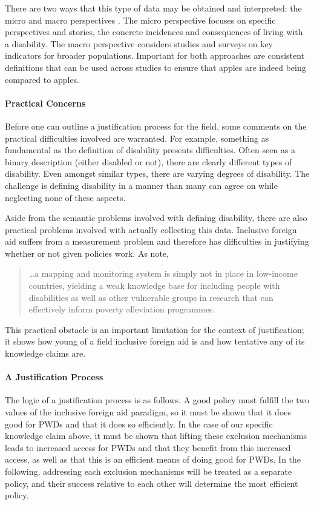 \documentclass[a4paper]{article}
\begin{document}
There are two ways that this type of data may be obtained and interpreted: the
micro and macro perspectives \citep{ingstad2011disability}. The micro
perspective focuses on specific perspectives and stories, the concrete
incidences and consequences of living with a disability. The macro perspective
considers studies and surveys on key indicators for broader populations.
Important for both approaches are consistent definitions that can be used
across studies to ensure that apples are indeed being compared to apples.

\paragraph{Practical Concerns}

Before one can outline a justification process for the field, some comments on
the practical difficulties involved are warranted. For example, something as
fundamental as the definition of disability presents difficulties. Often seen
as a binary description (either disabled or not), there are clearly different
types of disability. Even amongst similar types, there are varying degrees of
disability. The challenge is defining disability in a manner than many can
agree on while neglecting none of these aspects.

Aside from the semantic problems involved with defining disability, there are
also practical problems involved with actually collecting this data.
Inclusive foreign aid suffers from a measurement problem and therefore has
difficulties in justifying whether or not given policies work. As
\cite{ingstad2011disability} note,
%
\begin{quote}
    \ldots a mapping and monitoring system is simply not in place in
    low-income countries, yielding a weak knowledge base for including people
    with disabilities as well as other vulnerable groups in research that can
    effectively inform poverty alleviation programmes.
\end{quote}
%
This practical obstacle is an important limitation for the context of
justification; it shows how young of a field inclusive foreign aid is and how
tentative any of its knowledge claims are.

\paragraph{A Justification Process}

The logic of a justification process is as follows. A good policy must
fulfill the two values of the inclusive foreign aid paradigm, so it must be
shown that it does good for PWDs and that it does so efficiently. In the case
of our specific knowledge claim above, it must be shown that lifting these
exclusion mechanisms leads to increased access for PWDs and that they benefit
from this increased access, as well as that this is an efficient means of
doing good for PWDs. In the following, addressing each exclusion mechanisms
will be treated as a separate policy, and their success relative to each other
will determine the most efficient policy. 
\end{document}

